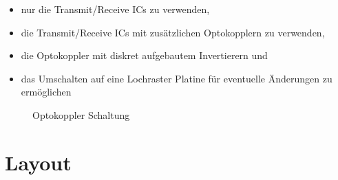\begin{itemize}
\item nur die Transmit/Receive ICs zu verwenden,
\item die Transmit/Receive ICs mit zusätzlichen Optokopplern zu verwenden,
\item die Optokoppler mit diskret aufgebautem Invertierern und
\item das Umschalten auf eine Lochraster Platine für eventuelle Änderungen zu ermöglichen
\end{itemize}



\begin{figure}[H]
    \centering    
    \caption{Optokoppler Schaltung}
    \label{Optokoppler}
\end{figure}




\section{Layout}







